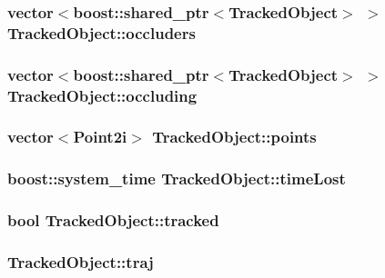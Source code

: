 \hypertarget{classTrackedObject_a01c84685f2934e13e75a056df18ee5ef}{
\subsubsection[{occluders}]{\setlength{\rightskip}{0pt plus 5cm}vector$<$boost\-::shared\-\_\-ptr$<${\bf \-Tracked\-Object}$>$ $>$ {\bf \-Tracked\-Object\-::occluders}}}\label{classTrackedObject_a01c84685f2934e13e75a056df18ee5ef}
\hypertarget{classTrackedObject_a481b19fee484951eec8fcd924bf80ef2}{
\subsubsection[{occluding}]{\setlength{\rightskip}{0pt plus 5cm}vector$<$boost\-::shared\-\_\-ptr$<${\bf \-Tracked\-Object}$>$ $>$ {\bf \-Tracked\-Object\-::occluding}}}\label{classTrackedObject_a481b19fee484951eec8fcd924bf80ef2}
\hypertarget{classTrackedObject_a4b7ea017a2a164eff41c149610be0066}{
\subsubsection[{points}]{\setlength{\rightskip}{0pt plus 5cm}vector$<$\-Point2i$>$ {\bf \-Tracked\-Object\-::points}}}\label{classTrackedObject_a4b7ea017a2a164eff41c149610be0066}
\hypertarget{classTrackedObject_a3802fb99c733a1e827023abac9faf5cf}{
\subsubsection[{time\-Lost}]{\setlength{\rightskip}{0pt plus 5cm}boost\-::system\-\_\-time {\bf \-Tracked\-Object\-::time\-Lost}}}\label{classTrackedObject_a3802fb99c733a1e827023abac9faf5cf}
\hypertarget{classTrackedObject_ac1c0ae4b925aff1f5a373fb2464e61ab}{
\subsubsection[{tracked}]{\setlength{\rightskip}{0pt plus 5cm}bool {\bf \-Tracked\-Object\-::tracked}}}\label{classTrackedObject_ac1c0ae4b925aff1f5a373fb2464e61ab}
\hypertarget{classTrackedObject_af6389ff5ac6cebc354b163a9e6eda07a}{
\subsubsection[{traj}]{ {\bf \-Tracked\-Object\-::traj}}}\label{classTrackedObject_af6389ff5ac6cebc354b163a9e6eda07a}


